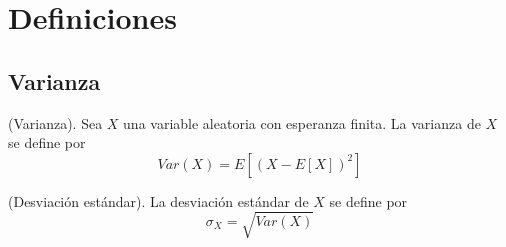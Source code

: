 \documentclass[../main.tex]{subfiles}
\begin{document}
\section{Definiciones}
    \subsection{Varianza}
        \begin{definition}(Varianza).
            Sea $X$ una variable aleatoria con esperanza finita. La varianza de $X$ se define por
            \begin{equation}
                 Var(X) = E[(X - E[X])^2]
            \end{equation}
        \end{definition}

        \begin{definition}(Desviación estándar).
            La desviación estándar de $X$ se define por
            \begin{equation}
                \sigma_X = \sqrt{Var(X)}
            \end{equation}
        \end{definition}
\end{document}
